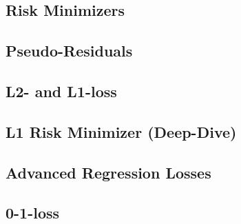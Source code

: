 

\subsection{Risk Minimizers}


\subsection{Pseudo-Residuals}


\subsection{L2- and L1-loss}


\subsection{L1 Risk Minimizer (Deep-Dive)}


\subsection{Advanced Regression Losses}


\subsection{0-1-loss}


